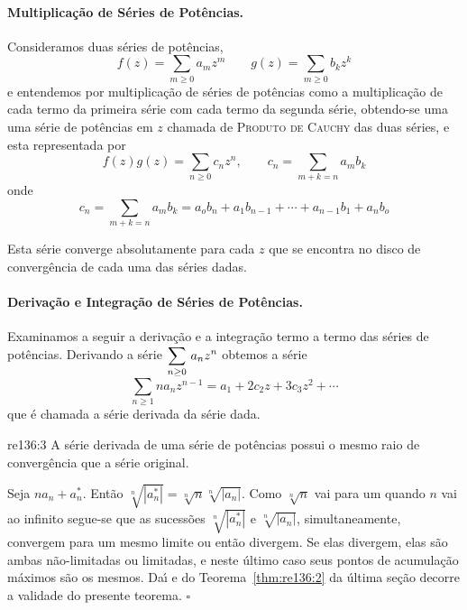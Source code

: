 \paragraph{Multiplica\c{c}\~{a}o de S\'{e}ries de Pot\^{e}ncias.}
Consideramos duas s\'{e}ries de pot\^{e}ncias,
\begin{equation*}
    f(z)=\sum_{m\ge 0}a_mz^m\qquad g(z)=\sum_{m\ge 0}b_kz^k
\end{equation*}
e entendemos por multiplica\c{c}\~{a}o de s\'{e}ries de pot\^{e}ncias como a
multiplica\c{c}\~{a}o de cada termo da primeira s\'{e}rie com cada termo da
segunda s\'{e}rie, obtendo-se uma uma s\'{e}rie de pot\^{e}ncias em $z$
chamada de \textsc{Produto de Cauchy} das duas s\'{e}ries, e esta
representada por
\begin{equation*}
    f(z)g(z)=\sum_{n\ge 0}c_nz^n,\qquad c_n=\sum_{m+k=n}a_mb_k
\end{equation*}
onde
\begin{equation*}
c_n=\sum_{m+k=n}a_mb_k=a_ob_n+a_1b_{n-1}+\cdots+a_{n-1}b_1+a_nb_o
\end{equation*}

Esta s\'{e}rie converge absolutamente para cada $z$ que se encontra no
disco de converg\^{e}ncia de cada uma das s\'{e}ries dadas.

\paragraph{Deriva\c{c}\~{a}o e Integra\c{c}\~{a}o de S\'{e}ries de Pot\^{e}ncias.}
Examinamos a seguir a deriva\c{c}\~{a}o e a integra\c{c}\~{a}o termo a termo das
s\'{e}ries de pot\^{e}ncias. Derivando a s\'{e}rie $\displaystyle{\sum_{n\geq 0}\,a_nz^n}$ obtemos a s\'{e}rie
\begin{equation}\label{funre136:9}
\sum_{n\geq 1}na_nz^{n-1}=a_1+2c_2z+3c_3z^2+\cdots
\end{equation}
que \'{e} chamada a s\'{e}rie derivada da s\'{e}rie dada.

\begin{theoc}{}{re136:3} 
A s\'{e}rie derivada de uma s\'{e}rie de pot\^{e}ncias possui o mesmo raio de converg\^{e}ncia 
que a s\'{e}rie original.
\end{theoc}

\prova Seja $na_n + a_n^*$. Ent\~{a}o $\sqrt[n]{|a_n^*|}
=\sqrt[n]{n}\sqrt[n]{|a_n|}$. Como $\sqrt[n]{n}$ vai para um
quando $n$ vai ao infinito segue-se que as sucess\~{o}es
$\sqrt[n]{|a_n^*|}$ e $\sqrt[n]{|a_n|}$, simultaneamente,
convergem para um mesmo limite ou ent\~{a}o divergem. Se elas
divergem, elas s\~{a}o ambas n\~{a}o-limitadas ou limitadas, e neste
\'{u}ltimo caso seus pontos de acumula\c{c}\~{a}o m\'{a}ximos s\~{a}o os mesmos. Da\'{\i} e
do Teorema~\ref{thm:re136:2} da \'{u}ltima se\c{c}\~{a}o decorre a validade do
presente teorema. \hfill $\square$

